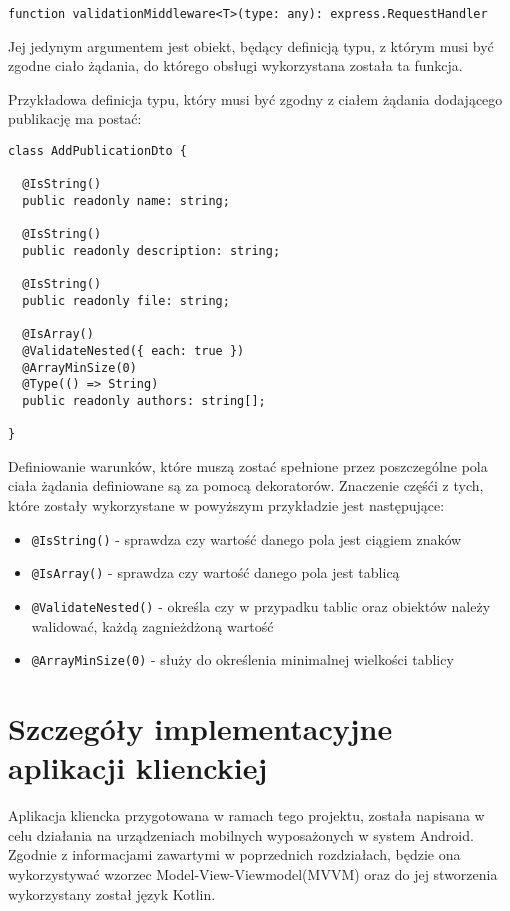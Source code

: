\documentclass[a4paper,12pt,twoside,openany]{report}
\begin{document}
\begin{verbatim}
function validationMiddleware<T>(type: any): express.RequestHandler
\end{verbatim}

Jej jedynym argumentem jest obiekt, będący definicją typu, z którym musi być zgodne ciało żądania, do którego obsługi wykorzystana została ta funkcja.

Przykładowa definicja typu, który musi być zgodny z ciałem żądania dodającego publikację ma postać: 
\begin{verbatim}
class AddPublicationDto {

  @IsString()
  public readonly name: string;

  @IsString()
  public readonly description: string;
  
  @IsString()
  public readonly file: string;

  @IsArray()
  @ValidateNested({ each: true })
  @ArrayMinSize(0)
  @Type(() => String)        
  public readonly authors: string[];

}
\end{verbatim}
Definiowanie warunków, które muszą zostać spełnione przez poszczególne pola ciała żądania definiowane są za pomocą dekoratorów. Znaczenie częśći z tych, które zostały wykorzystane w powyższym przykładzie jest następujące: 
\begin{itemize}
	\item \verb|@IsString()| - sprawdza czy wartość danego pola jest ciągiem znaków
	\item \verb|@IsArray()| - sprawdza czy wartość danego pola jest tablicą 
	\item \verb|@ValidateNested()| - określa czy w przypadku tablic oraz obiektów należy walidować, każdą zagnieżdżoną wartość 
	\item \verb|@ArrayMinSize(0)| - służy do określenia minimalnej wielkości tablicy
\end{itemize}

\chapter{Szczegóły implementacyjne aplikacji klienckiej}

Aplikacja kliencka przygotowana w ramach tego projektu, została napisana w celu działania na urządzeniach mobilnych wyposażonych w system Android. Zgodnie z informacjami zawartymi w poprzednich rozdziałach, będzie ona wykorzystywać wzorzec Model-View-Viewmodel(MVVM) oraz do jej stworzenia wykorzystany został język Kotlin. 
\end{document}
